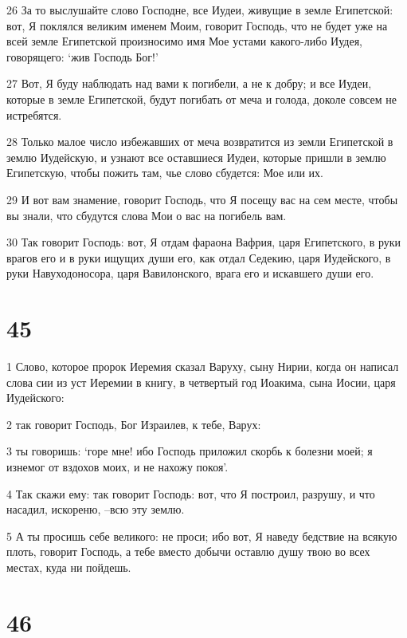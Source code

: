 \par 26 За то выслушайте слово Господне, все Иудеи, живущие в земле Египетской: вот, Я поклялся великим именем Моим, говорит Господь, что не будет уже на всей земле Египетской произносимо имя Мое устами какого-либо Иудея, говорящего: `жив Господь Бог!'
\par 27 Вот, Я буду наблюдать над вами к погибели, а не к добру; и все Иудеи, которые в земле Египетской, будут погибать от меча и голода, доколе совсем не истребятся.
\par 28 Только малое число избежавших от меча возвратится из земли Египетской в землю Иудейскую, и узнают все оставшиеся Иудеи, которые пришли в землю Египетскую, чтобы пожить там, чье слово сбудется: Мое или их.
\par 29 И вот вам знамение, говорит Господь, что Я посещу вас на сем месте, чтобы вы знали, что сбудутся слова Мои о вас на погибель вам.
\par 30 Так говорит Господь: вот, Я отдам фараона Вафрия, царя Египетского, в руки врагов его и в руки ищущих души его, как отдал Седекию, царя Иудейского, в руки Навуходоносора, царя Вавилонского, врага его и искавшего души его.

\chapter{45}

\par 1 Слово, которое пророк Иеремия сказал Варуху, сыну Нирии, когда он написал слова сии из уст Иеремии в книгу, в четвертый год Иоакима, сына Иосии, царя Иудейского:
\par 2 так говорит Господь, Бог Израилев, к тебе, Варух:
\par 3 ты говоришь: `горе мне! ибо Господь приложил скорбь к болезни моей; я изнемог от вздохов моих, и не нахожу покоя'.
\par 4 Так скажи ему: так говорит Господь: вот, что Я построил, разрушу, и что насадил, искореню, --всю эту землю.
\par 5 А ты просишь себе великого: не проси; ибо вот, Я наведу бедствие на всякую плоть, говорит Господь, а тебе вместо добычи оставлю душу твою во всех местах, куда ни пойдешь.

\chapter{46}

